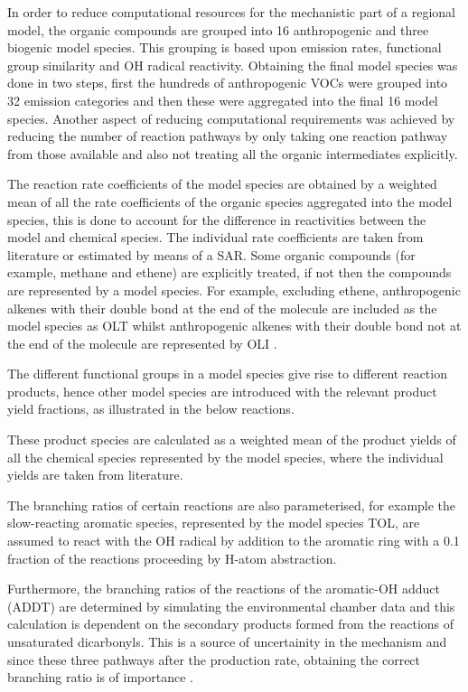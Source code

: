 In order to reduce computational resources for the mechanistic part of a regional model, the organic compounds are grouped into
16 anthropogenic and three biogenic model species. This grouping is based upon emission rates, functional group similarity and 
OH radical reactivity. Obtaining the final model species was done in two steps, first the hundreds of anthropogenic VOCs were 
grouped into 32 emission categories and then these were aggregated into the final 16 model species. Another aspect of reducing 
computational requirements was achieved by reducing the number of reaction pathways by only taking one reaction pathway from 
those available and also not treating all the organic intermediates explicitly.

The reaction rate coefficients of the model species are obtained by a weighted mean of all the rate coefficients of the organic
species aggregated into the model species, this is done to account for the difference in reactivities between the model and 
chemical species. The individual rate coefficients are taken from literature or estimated by means of a SAR. Some organic 
compounds (for example, methane and ethene) are explicitly treated, if not then the compounds are represented by a model 
species. For example, excluding ethene, anthropogenic alkenes with their double bond at the end of the molecule are included as
the model species as OLT whilst anthropogenic alkenes with their double bond not at the end of the molecule are represented by 
OLI \citep{Stockwell:1997}.

The different functional groups in a model species give rise to different reaction products, hence other model species are 
introduced with the relevant product yield fractions, as illustrated in the below reactions.
\begin{reactionlist}
\end{reactionlist}
These product species are calculated as a weighted mean of the product yields of all the chemical species represented by the 
model species, where the individual yields are taken from literature. 

The branching ratios of certain reactions are also parameterised, for example the slow-reacting aromatic species, represented by
the model species TOL, are assumed to react with the OH radical by addition to the aromatic ring with a 0.1 fraction of the 
reactions proceeding by H-atom abstraction.
\begin{reactionlist}
\end{reactionlist}
Furthermore, the branching ratios of the reactions of the aromatic-OH adduct (ADDT) are determined by simulating the 
environmental chamber data and this calculation is dependent on the secondary products formed from the reactions of unsaturated 
dicarbonyls. This is a source of uncertainity in the mechanism and since these three pathways after the  production rate,
obtaining the correct branching ratio is of importance \citep{Stockwell:1997}.

